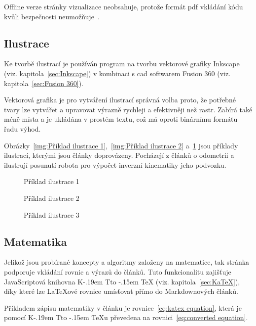 \documentclass[a4paper, 12pt]{article}
\makeatletter
\newcommand*{\fullref}[1]{\hyperref[{#1}]{\ref*{#1}}}
\DeclareRobustCommand{\KaTeX}{%
  K\kern -.19em
  {\sbox \z@ T\vbox to\ht \z@ {\hbox{%
  \check@mathfonts
  \fontsize\sf@size\z@
  \selectfont A}%
  \vss}%
}\kern -.15em
\TeX}
\makeatother
\begin{document}
  Offline verze stránky vizualizace neobsahuje, protože formát \gls{pdf} vkládání kódu kvůli bezpečnosti neumožňuje~\cite{history-of-pdf}.


  \subsection{Ilustrace} \label{sec:Ilustrace}
  Ke tvorbě ilustrací je používán program na tvorbu vektorové grafiky Inkscape (viz. kapitola~\fullref{sec:Inkscape}) v kombinaci s \gls{cad} softwarem Fusion 360 (viz. kapitola~\fullref{sec:Fusion 360}).

  Vektorová grafika je pro vytváření ilustrací správná volba proto, že potřebné tvary lze vytvářet a upravovat výrazně rychleji a efektivněji než rastr. Zabírá také méně místa a je ukládána v prostém textu, což má oproti binárnímu formátu řadu výhod.

  Obrázky~\ref{img:Příklad ilustrace 1},~\ref{img:Příklad ilustrace 2} a~\ref{img:Příklad ilustrace 3} jsou příklady ilustrací, kterými jsou články doprovázeny. Pocházejí z článků o odometrii a ilustrují posunutí robota pro výpočet inverzní kinematiky jeho podvozku.

  \begin{figure}[H]
      \caption{Příklad ilustrace 1} \label{img:Příklad ilustrace 1}
    \endminipage\hfill
      \caption{Příklad ilustrace 2} \label{img:Příklad ilustrace 2}
    \endminipage\hfill
      \caption{Příklad ilustrace 3} \label{img:Příklad ilustrace 3}
    \endminipage
  \end{figure}


  \subsection{Matematika} \label{sec:Matematika}
  Jelikož jsou probírané koncepty a algoritmy založeny na matematice, tak stránka podporuje vkládání rovnic a výrazů do článků. Tuto funkcionalitu zajišťuje JavaScriptová knihovna \KaTeX{} (viz. kapitola~\fullref{sec:KaTeX}), díky které lze \LaTeX ové rovnice umísťovat přímo do Markdownových článků.

  Příkladem zápisu matematiky v článku je rovnice~\ref{eq:katex equation}, která je pomocí \KaTeX u převedena na rovnici~\ref{eq:converted equation}.
\end{document}

